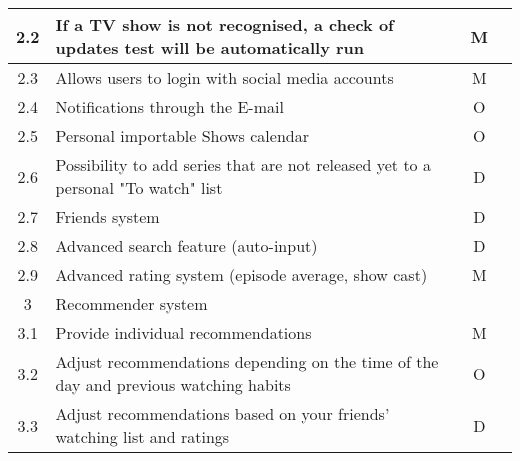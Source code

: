 \begin{tabularx}{\textwidth}{|c|X|c|X|}
2.2     & If a TV show is not recognised, a check of updates test will be automatically run                                                                  & M        \\ \hline
2.3     & Allows users to login with social media accounts                                                                                                   & M        \\ \hline
2.4     & Notifications through the E-mail                                                                                                                   & O        \\ \hline
2.5     & Personal importable Shows calendar                                                                                                                 & O        \\ \hline
2.6     & Possibility to add series that are not released yet to a personal "To watch" list                                                                  & D        \\ \hline
2.7     & Friends system                                                                                                                                     & D        \\ \hline
2.8     & Advanced search feature (auto-input)                                                                                                               & D        \\ \hline
2.9     & Advanced rating system (episode average, show cast)                                                                                                & M        \\ \hline
3       & \multicolumn{2}{l|}{Recommender system}                                                                                                                       \\ \hline
3.1     & Provide individual recommendations                                                                                                                 & M        \\ \hline
3.2     & Adjust recommendations depending on the time of the day and previous watching habits                                                               & O        \\ \hline
3.3     & Adjust recommendations based on your friends' watching list and ratings                                                                            & D        \\ \hline

\end{tabularx}
